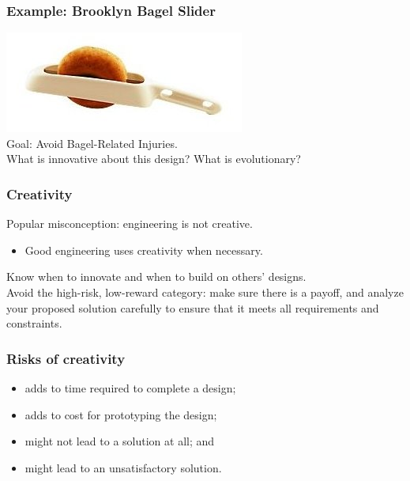 \begin{frame}
\frametitle{Example: Brooklyn Bagel Slider}

\begin{changemargin}{1.5cm}
\includegraphics[width=.8\textwidth]{images/bbs.jpg}\\[1em]

Goal: Avoid Bagel-Related Injuries.\\[1em]

\alert{What is innovative about this design? What is evolutionary?}
\end{changemargin}
\end{frame}

\begin{frame}
\frametitle{Creativity}

\begin{changemargin}{1cm}
Popular misconception: engineering is not creative.

\begin{itemize}
\item Good engineering uses creativity
when necessary.
\end{itemize}

Know when to innovate and when to build on others' designs.\\[1em]

Avoid the high-risk, low-reward category: make sure there is a payoff,
and analyze your proposed solution carefully to ensure that it meets
all requirements and constraints.
\end{changemargin}

\end{frame}

\begin{frame}

\frametitle{Risks of creativity}

\large
\begin{changemargin}{1.5cm}
\begin{itemize}
\item adds to time required to complete a design; 
\item adds to cost for prototyping the design;
\item might not lead to a solution at all; and
\item might lead to an unsatisfactory solution.
\end{itemize}
\end{changemargin}

\end{frame}


